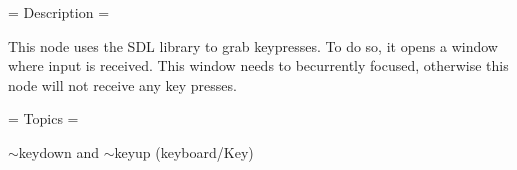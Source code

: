 = Description =

This node uses the S\+DL library to grab keypresses. To do so, it opens a window where input is received. This window needs to becurrently focused, otherwise this node will not receive any key presses.

= Topics =

$\sim$keydown and $\sim$keyup (keyboard/\+Key) 